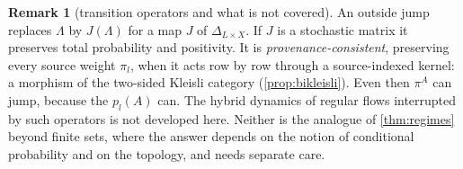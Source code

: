\documentclass[11pt]{article}
\theoremstyle{definition}\newtheorem{definition}[theorem]{Definition}\newtheorem{remark}[theorem]{Remark}\newtheorem{example}[theorem]{Example}
\begin{document}
\begin{center}\small
{}
\end{center}

\begin{remark}[transition operators and what is not covered]
An outside jump replaces $\Lambda$ by $J(\Lambda)$ for a map $J$ of $\Delta_{L\times X}$. If $J$ is a stochastic matrix it preserves total probability
and positivity. It is \emph{provenance-consistent}, preserving every source weight $\pi_l$, when it acts row by row through a source-indexed
kernel: a morphism of the two-sided Kleisli category (\cref{prop:bikleisli}). Even then $\pi^A$ can jump, because the $p_l(A)$ can. The hybrid
dynamics of regular flows interrupted by such operators is not developed here. Neither is the analogue of \cref{thm:regimes} beyond
finite sets, where the answer depends on the notion of conditional probability and on the topology, and needs separate care.
\end{remark}
\end{document}
